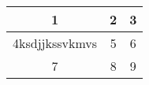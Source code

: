 \begin{center}\begin{tabular}{|c|c|c|} \hline 1 & 2 & 3\\ \hline 4ksdjjkssvkmvs & 5 & 6\\ \hline 7 & 8 & 9\\ \hline\end{tabular}\end{center}